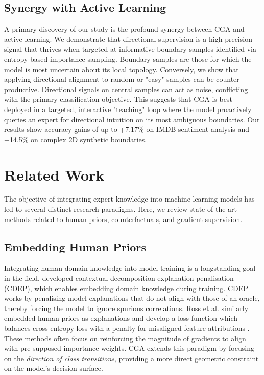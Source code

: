 \documentclass[sigconf,anonymous]{aamas}
\begin{document}
\subsection{Synergy with Active Learning}
A primary discovery of our study is the profound synergy between CGA and active learning. We demonstrate that directional supervision is a high-precision signal that thrives when targeted at informative boundary samples identified via entropy-based importance sampling. Boundary samples are those for which the model is most uncertain about its local topology. Conversely, we show that applying directional alignment to random or "easy" samples can be counter-productive. Directional signals on central samples can act as noise, conflicting with the primary classification objective. This suggests that CGA is best deployed in a targeted, interactive "teaching" loop where the model proactively queries an expert for directional intuition on its most ambiguous boundaries. Our results show accuracy gains of up to +7.17\% on IMDB sentiment analysis and +14.5\% on complex 2D synthetic boundaries.

\section{Related Work}
\label{related_work}

The objective of integrating expert knowledge into machine learning models has led to several distinct research paradigms. Here, we review state-of-the-art methods related to human priors, counterfactuals, and gradient supervision.

\subsection{Embedding Human Priors}
Integrating human domain knowledge into model training is a longstanding goal in the field. \citeauthor{rieger2020interpretations} \cite{rieger2020interpretations} developed contextual decomposition explanation penalisation (CDEP), which enables embedding domain knowledge during training. CDEP works by penalising model explanations that do not align with those of an oracle, thereby forcing the model to ignore spurious correlations. Ross et al. similarly embedded human priors as explanations and develop a loss function which balances cross entropy loss with a penalty for misaligned feature attributions \cite{ross2017right}. These methods often focus on reinforcing the magnitude of gradients to align with pre-supposed importance weights. CGA extends this paradigm by focusing on the \emph{direction of class transitions}, providing a more direct geometric constraint on the model's decision surface.
\end{document}
